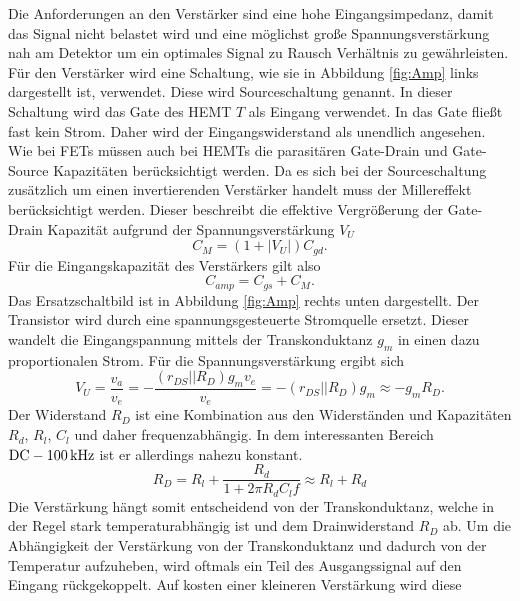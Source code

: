 Die Anforderungen an den Verstärker sind eine hohe Eingangsimpedanz, damit das Signal nicht belastet wird und eine möglichst große Spannungsverstärkung nah am Detektor um ein optimales Signal zu Rausch Verhältnis zu gewährleisten.
Für den Verstärker wird eine Schaltung, wie sie in Abbildung \ref{fig:Amp} links dargestellt ist, verwendet.
Diese wird Sourceschaltung\cite{Tietze2002} genannt.
In dieser Schaltung wird das Gate des HEMT $T$ als Eingang verwendet.
In das Gate fließt fast kein Strom.
Daher wird der Eingangswiderstand als unendlich angesehen.
Wie bei FETs müssen auch bei HEMTs die parasitären Gate-Drain und Gate-Source Kapazitäten berücksichtigt werden.
Da es sich bei der Sourceschaltung zusätzlich um einen invertierenden Verstärker handelt muss der Millereffekt berücksichtigt werden.
Dieser beschreibt die effektive Vergrößerung der Gate-Drain Kapazität aufgrund der Spannungsverstärkung $V_U$
\begin{equation}
C_M = (1+ |V_U|)C_{gd}.
\end{equation}
Für die Eingangskapazität des Verstärkers gilt also 
\begin{equation}
C_{amp} = C_{gs} + C_M.
\label{eq:Camp}
\end{equation}
Das Ersatzschaltbild ist in Abbildung \ref{fig:Amp} rechts unten dargestellt.
Der Transistor wird durch eine spannungsgesteuerte Stromquelle ersetzt.
Dieser wandelt die Eingangspannung mittels der Transkonduktanz $g_m$ in einen dazu proportionalen Strom.
Für die Spannungsverstärkung ergibt sich
\begin{equation}
V_U = \frac{v_a}{v_e} = -\frac{(r_{DS}||R_D)g_mv_e}{v_e} = -(r_{DS}||R_D)g_m \approx
-g_m R_D.
\label{eq:amp}
\end{equation}
Der Widerstand $R_D$ ist eine Kombination aus den Widerständen und Kapazitäten $R_d$, $R_l$, $C_l$ und daher frequenzabhängig.
In dem interessanten Bereich $\text{DC} \-- \SI{100}{\kilo\hertz}$ ist er allerdings nahezu konstant.
\begin{equation}
R_D = R_l + \frac{R_d}{1 + 2\pi R_d C_l f} \approx R_l + R_d
\end{equation}
Die Verstärkung hängt somit entscheidend von der Transkonduktanz, welche in der Regel stark temperaturabhängig ist und dem Drainwiderstand $R_D$ ab.
Um die Abhängigkeit der Verstärkung von der Transkonduktanz und dadurch von der Temperatur aufzuheben, wird oftmals ein Teil des Ausgangssignal auf den Eingang rückgekoppelt.
Auf kosten einer kleineren Verstärkung wird diese 
